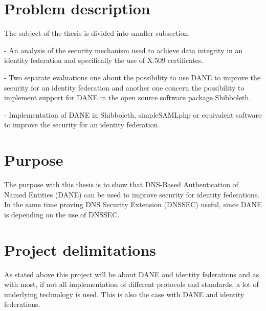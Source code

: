 
\section{Problem description}
The subject of the thesis is divided into smaller subsection. 

- An analysis of the security mechanism used to achieve data integrity in an identity federation and specifically the use of X.509 certificates.

- Two separate evaluations one about the possibility to use DANE to improve the security for an identity federation
and another one concern the possibility to implement support for DANE in the open source software package Shibboleth.

- Implementation of DANE in Shibboleth, simpleSAMLphp or equivalent software to improve the security for an identity federation.


\section{Purpose}
The purpose with this thesis is to show that DNS-Based Authentication of Named Entities (DANE) \cite{rfc:6394,rfc:draft-dane,rfc:draft-smime} can be used to improve security for identity federations.
In the same time proving DNS Security Extension (DNSSEC) \cite{rfc:4033,rfc:4034,rfc:4035,rfc:5011} useful, since DANE is 
depending on the use of DNSSEC.

\section{Project delimitations}
As stated above this project will be about DANE and identity federations and as with most, if not all implementation of different protocols and standards, a lot of underlying technology is used.
This is also the case with DANE and identity federations.

